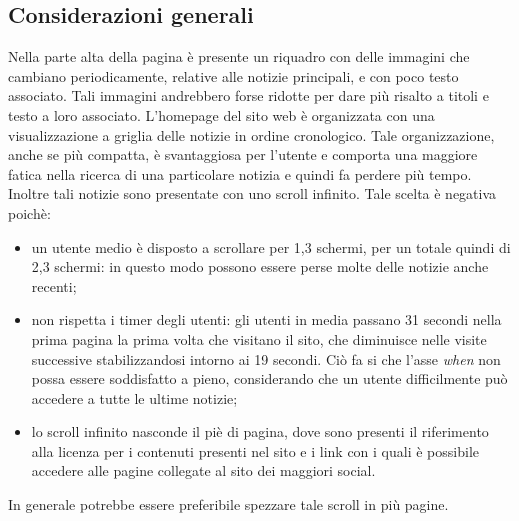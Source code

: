 \documentclass[../ProgettoTecWeb2.tex]{subfiles}
\begin{document}
	\subsection{Considerazioni generali}
		Nella parte alta della pagina è presente un riquadro con delle immagini che cambiano periodicamente, relative alle notizie principali, e con poco testo associato. Tali immagini andrebbero forse ridotte per dare più risalto a titoli e testo a loro associato.
		L'homepage del sito web è organizzata con una visualizzazione a griglia delle notizie in ordine cronologico. Tale organizzazione, anche se più compatta, è svantaggiosa per l'utente e comporta una maggiore fatica nella ricerca di una particolare notizia e quindi fa perdere più tempo.
		Inoltre tali notizie sono presentate con uno scroll infinito. Tale scelta è negativa poichè:
		\begin{itemize}
			\item un utente medio è disposto a scrollare per 1,3 schermi, per un totale quindi di 2,3 schermi: in questo modo possono essere perse molte delle notizie anche recenti;
			\item non rispetta i timer degli utenti: gli utenti in media passano 31 secondi nella prima pagina la prima volta che visitano il sito, che diminuisce nelle visite successive stabilizzandosi intorno ai 19 secondi. Ciò fa si che l'asse \textit{when} non possa essere soddisfatto a pieno, considerando che un utente difficilmente può accedere a tutte le ultime notizie;
			\item lo scroll infinito nasconde il piè di pagina, dove sono presenti il riferimento alla licenza per i contenuti presenti nel sito e i link con i quali è possibile accedere alle pagine collegate al sito dei maggiori social. 
		\end{itemize}
		In generale potrebbe essere preferibile spezzare tale scroll in più pagine. 
\end{document}
